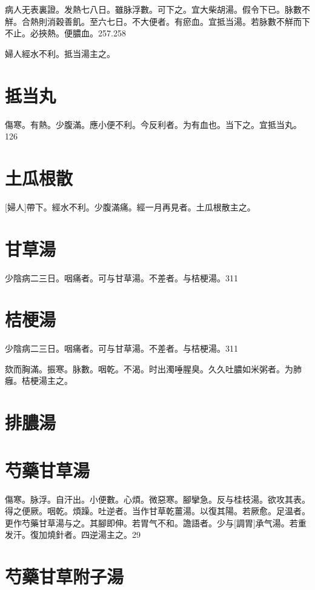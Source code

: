 \documentclass[12pt,twoside,UTF8,b5paper]{ctexbook}
\begin{document}
病人无表裏證。发熱七八日。雖脉浮數。可下之。宜大柴胡湯。假令下已。脉數不觧。合熱則消穀善飢。至六七日。不大便者。有瘀血。宜抵当湯。若脉數不觧而下不止。必挾熱。便膿血。257.258

婦人經水不利。抵当湯主之。

\section{抵当丸}

傷寒。有熱。少腹滿。應小便不利。今反利者。为有血也。当下之。宜抵当丸。126

\section{土瓜根散}

[婦人]帶下。經水不利。少腹滿痛。經一月再見者。土瓜根散主之。

\section{甘草湯}

少陰病二三日。咽痛者。可与甘草湯。不差者。与桔梗湯。311

\section{桔梗湯}

少陰病二三日。咽痛者。可与甘草湯。不差者。与桔梗湯。311

欬而胸滿。振寒。脉數。咽乾。不渴。时出濁唾腥臭。久久吐膿如米粥者。为肺癰。桔梗湯主之。

\section{排膿湯}

\section{芍藥甘草湯}

傷寒。脉浮。自汗出。小便數。心煩。微惡寒。腳攣急。反与桂枝湯。欲攻其表。得之便厥。咽乾。煩躁。吐逆者。当作甘草乾薑湯。以復其陽。若厥愈。足温者。更作芍藥甘草湯与之。其腳即伸。若胃气不和。譫語者。少与[調胃]承气湯。若重发汗。復加燒針者。四逆湯主之。29

\section{芍藥甘草附子湯}
\end{document}
